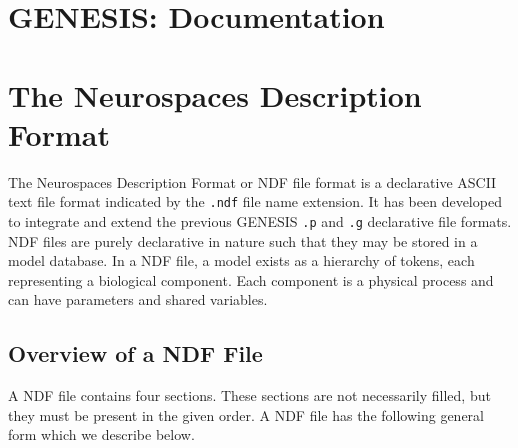 \documentclass[12pt]{article}
\begin{document}
\section*{GENESIS: Documentation}

\section*{The Neurospaces Description Format}

The Neurospaces Description Format or NDF file format is a declarative ASCII text file format indicated by the {\tt .ndf} file name extension. It has been developed to integrate and extend the previous GENESIS {\tt .p} and {\tt .g} declarative file formats. NDF files are purely declarative in nature such that they may be stored in a model database. In a NDF file, a model exists as a hierarchy of tokens, each representing a biological component. Each component is a physical process and can have parameters and shared variables. 

\subsection*{Overview of a NDF File}
\label{sec:overview-ndf-file}
A NDF file contains four sections. These sections are not necessarily
filled, but they must be present in the given order.  A NDF file has
the following general form which we describe below.
\end{document}
